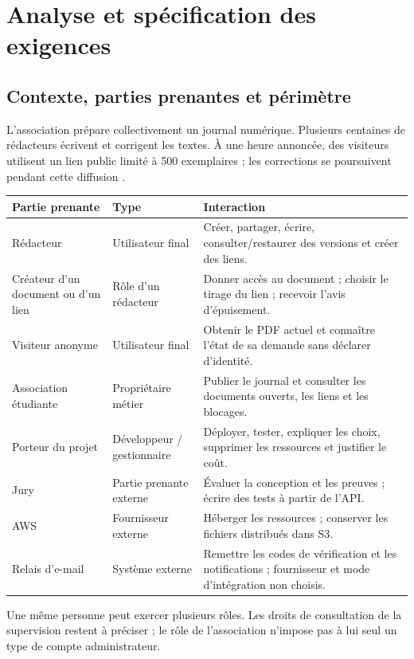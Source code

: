\chapter{Analyse et spécification des exigences}

\section{Contexte, parties prenantes et périmètre}
L'association prépare collectivement un journal numérique. Plusieurs centaines de rédacteurs écrivent et corrigent les textes. 
À une heure annoncée, des visiteurs utilisent un lien public limité à 500 exemplaires ; les corrections se poursuivent pendant cette diffusion \cite[p. 1]{sujet}.

\begin{longtable}{@{}L{34mm}L{32mm}L{87mm}@{}}
\toprule Partie prenante & Type  & Interaction\\\midrule\endhead
Rédacteur & Utilisateur final & Créer, partager, écrire, consulter/restaurer des versions et créer des liens.\\
Créateur d'un document ou d'un lien & Rôle d'un rédacteur & Donner accès au document ; choisir le tirage du lien ; recevoir l'avis d'épuisement.\\
Visiteur anonyme & Utilisateur final & Obtenir le PDF actuel et connaître l'état de sa demande sans déclarer d'identité.\\
Association étudiante & Propriétaire métier & Publier le journal et consulter les documents ouverts, les liens et les blocages.\\
Porteur du projet & Développeur / gestionnaire & Déployer, tester, expliquer les choix, supprimer les ressources et justifier le coût.\\
Jury & Partie prenante externe & Évaluer la conception et les preuves ; écrire des tests à partir de l'API.\\
AWS & Fournisseur externe & Héberger les ressources ; conserver les fichiers distribués dans S3.\\
Relais d'e-mail & Système externe & Remettre les codes de vérification et les notifications ; fournisseur et mode d'intégration non choisis.\\\bottomrule
\end{longtable}
Une même personne peut exercer plusieurs rôles. Les droits de consultation de la supervision restent à préciser ; le rôle de l'association n'impose pas à lui seul un type de compte administrateur.

